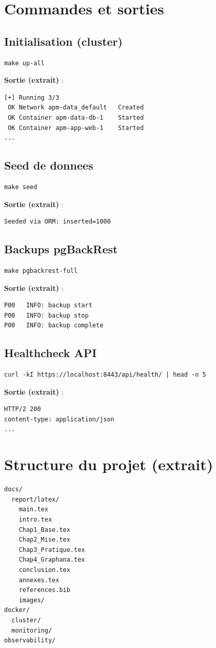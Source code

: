 \section{Commandes et sorties}

\subsection*{Initialisation (cluster)}
\begin{verbatim}
make up-all
\end{verbatim}
\textbf{Sortie (extrait)} :
\begin{verbatim}
[+] Running 3/3
 OK Network apm-data_default   Created
 OK Container apm-data-db-1    Started
 OK Container apm-app-web-1    Started
...
\end{verbatim}

\subsection*{Seed de donnees}
\begin{verbatim}
make seed
\end{verbatim}
\textbf{Sortie (extrait)} :
\begin{verbatim}
Seeded via ORM: inserted=1000
\end{verbatim}

\subsection*{Backups pgBackRest}
\begin{verbatim}
make pgbackrest-full
\end{verbatim}
\textbf{Sortie (extrait)} :
\begin{verbatim}
P00   INFO: backup start
P00   INFO: backup stop
P00   INFO: backup complete
\end{verbatim}

\subsection*{Healthcheck API}
\begin{verbatim}
curl -kI https://localhost:8443/api/health/ | head -n 5
\end{verbatim}
\textbf{Sortie (extrait)} :
\begin{verbatim}
HTTP/2 200
content-type: application/json
...
\end{verbatim}

\section{Structure du projet (extrait)}
\begin{verbatim}
docs/
  report/latex/
    main.tex
    intro.tex
    Chap1_Base.tex
    Chap2_Mise.tex
    Chap3_Pratique.tex
    Chap4_Graphana.tex
    conclusion.tex
    annexes.tex
    references.bib
    images/
docker/
  cluster/
  monitoring/
observability/
\end{verbatim}

